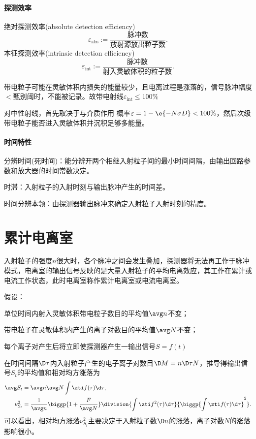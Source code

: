 \paragraph{探测效率}
绝对探测效率(absolute detection efficiency)
\[
	\varepsilon_{\mathrm{abs}}:=\frac{\text{脉冲数}}{\text{放射源放出粒子数}}.
\]
本征探测效率(intrinsic detection efficiency)
\[
	\varepsilon_{\mathrm{int}}:=\frac{\text{脉冲数}}{\text{射入灵敏体积的粒子数}}.
\]

带电粒子可能在灵敏体积内损失的能量较少，且电离过程是涨落的，信号脉冲幅度$<$甄别阈时，不能被记录。故带电射线$\varepsilon_{\mathrm{int}}\leqslant 100\%$

对中性射线，首先取决于与介质作用%
概率$\varepsilon=1-\e{-N\sigma D}<100\%$，然后次级带电粒子能否进入灵敏体积并沉积足够多能量。
\paragraph{时间特性}
分辨时间(死时间)：能分辨开两个相继入射粒子间的最小时间间隔，由输出回路参数和放大器的时间常数决定。

时滞：入射粒子的入射时刻与输出脉冲产生的时间差。

时间分辨本领：由探测器输出脉冲来确定入射粒子入射时刻的精度。

\section{累计电离室}

入射粒子的强度$n$很大时，各个脉冲之间会发生叠加，探测器将无法再工作于脉冲模式，电离室的输出信号反映的是大量入射粒子的平均电离效应，其工作在累计或电流工作状态，此时电离室称作累计电离室或电流电离室。


假设：
\begin{compactenum}
	\item 单位时间内射入灵敏体积带电粒子数目的平均值$\avg n$不变；
	\item 带电粒子在灵敏体积内产生的离子对数目的平均值$\avg N$不变；
	\item 每个离子对产生后将立即使探测器产生一输出信号$S=f(t)$
\end{compactenum}
在时间间隔$\D\tau$内入射粒子产生的电子离子对数目$\D M=n\D\tau N$，推导得输出信号$S_t$的平均值和相对均方涨落为
\begin{align*}
	\avg S_t&=\avg n\avg N\int\zti f(\tau)\d\tau,\\
	\nu_{S_t}^2&=\frac1{\avg n}\biggp{1+\frac F{\avg N}}\division{\int\zti f^2(\tau)\d\tau}{\biggp{\int\zti f(\tau)\d\tau}^2}.
\end{align*}
可以看出，相对均方涨落$\nu_{S_t}^2$主要决定于入射粒子数$\D n$的涨落，离子对数$N$的涨落影响很小。
